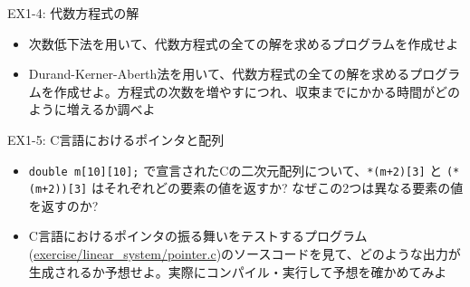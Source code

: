 \documentclass[dvipdfmx]{beamer}
\begin{document}
\begin{frame}[t,fragile]{EX1-4: 代数方程式の解}
  \begin{itemize}
    \setlength{\itemsep}{1em}
  \item[1-4-1] 次数低下法を用いて、代数方程式の全ての解を求めるプログラムを作成せよ
  \item[1-4-2] Durand-Kerner-Aberth法を用いて、代数方程式の全ての解を求めるプログラムを作成せよ。方程式の次数を増やすにつれ、収束までにかかる時間がどのように増えるか調べよ
  \end{itemize}    
\end{frame}

\begin{frame}[t,fragile]{EX1-5: C言語におけるポインタと配列}
  \begin{itemize}
    \setlength{\itemsep}{1em}
  \item[1-5-1] \verb+double m[10][10];+ で宣言されたCの二次元配列について、\verb^*(m+2)[3]^ と \verb^(*(m+2))[3]^ はそれぞれどの要素の値を返すか? なぜこの2つは異なる要素の値を返すのか?
  \item[1-5-2] C言語におけるポインタの振る舞いをテストするプログラム(\href{https://github.com/todo-group/computer-experiments/blob/master/exercise/linear_system/pointer.c}{exercise/linear\_system/pointer.c})のソースコードを見て、どのような出力が生成されるか予想せよ。実際にコンパイル・実行して予想を確かめてみよ
  \end{itemize}
\end{frame}
\end{document}
